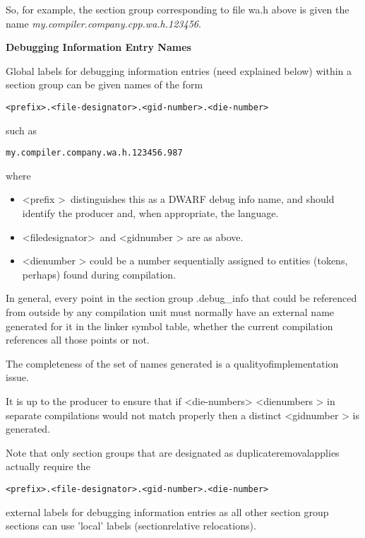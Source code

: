 So, for example, the section group corresponding to file wa.h
above is given the name \textit{my.compiler.company.cpp.wa.h.123456}.



\textbf{Debugging Information Entry Names}

Global labels for debugging information entries (need explained
below) within a section group can be given names of the form

\begin{alltt}
    <prefix>.<file-designator>.<gid-number>.<die-number>
\end{alltt}

such as

\begin{alltt}
    my.compiler.company.wa.h.123456.987
\end{alltt}

where
\begin{itemize}
\item \textless prefix \textgreater\  
distinguishes this as a DWARF debug info name, and should identify the producer
and, when appropriate, the language.
\item \textless file\dash designator\textgreater\  
and 
\textless gid\dash number \textgreater
are as above.

\item  \textless die\dash number \textgreater
could be a number sequentially assigned 
to entities (tokens, perhaps) found
during compilation.

\end{itemize}

In general, every point in the section group .debug\_info that
could be referenced from outside by any compilation unit must
normally have an external name generated for it in the linker
symbol table, whether the current compilation references all
those points or not.

The completeness of the set of names generated is a
quality\dash of\dash implementation issue.

It is up to the producer to ensure that if 
<die-numbers>
\textless die\dash numbers \textgreater
in separate compilations would not match properly then a
distinct 
\textless gid\dash number \textgreater
is generated.

Note that only section groups that are designated as
duplicate\dash removal\dash applies actually require the
\begin{alltt}
    <prefix>.<file-designator>.<gid-number>.<die-number>
\end{alltt}
external labels for debugging information entries as all other
section group sections can use 'local' labels 
(section\dash relative
relocations).


